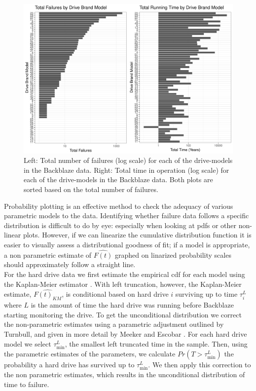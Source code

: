 \documentclass[12pt]{article}
\begin{document}
\begin{figure}[H]
\includegraphics[width=\textwidth]{fig/data_sum.pdf}
\caption{Left: Total number of failures (log scale) for each of the drive-models in the Backblaze data. Right: Total time in operation (log scale) for each of the drive-models in the Backblaze data.  Both plots are sorted based on the total number of failures.}
\label{fig1}
\end{figure}


Probability plotting is an effective method to check the adequacy of various parametric models to the data.  Identifying whether failure data follows a specific distribution is difficult to do by eye: especially when looking at pdfs or other non-linear plots.  However, if we can linearize the cumulative distribution function it is easier to visually assess a distributional goodness of fit; if a model is appropriate, a non parametric estimate of $\hat{F(t)}$ graphed on linarized probability scales should approximately follow a straight line. \\

For the hard drive data we first estimate the empirical cdf for each model using the Kaplan-Meier estimator \cite{kaplan}.  With left truncation, however, the Kaplan-Meier estimate, $\widehat{F(t)_{KM}}$, is conditional based on hard drive $i$ surviving up to time $\tau_i^L$ where $L$ is the amount of time the hard drive was running before Backblaze starting monitoring the drive.  To get the unconditional distribution we correct the non-parametric estimates using a parametric adjustment outlined by Turnbull, and given in more detail by Meeker and Escobar \cite{turnbull,meeker}.  For each hard drive model we select $\tau_{\text{min}}^L$, the smallest left truncated time in the sample.  Then, using the parametric estimates of the parameters, we calculate $Pr(T>\tau_\text{min}^L)$ the probability a hard drive has survived up to $\tau_{\text{min}}^L$.  We then apply this correction to the non parametric estimates, which results in the unconditional distribution of time to failure.\\
\end{document}

